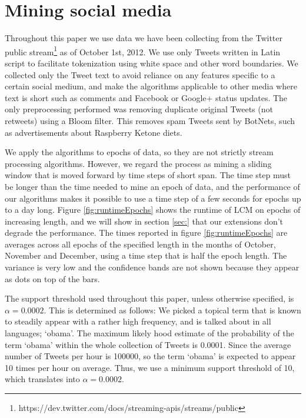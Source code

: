 \documentclass{sig-alternate}
\begin{document}

\section{Mining social media}
\label{sec:socmine}

Throughout this paper we use data we have been collecting from the Twitter public stream\footnote{https://dev.twitter.com/docs/streaming-apis/streams/public} as of October 1st, 2012. 
We use only Tweets written in Latin script to facilitate tokenization using white space and other word boundaries. We collected only the Tweet text to avoid reliance on any features specific to a certain social medium, and make the algorithms applicable to other media where text is short such as comments and Facebook or Google+ status updates. The only preprocessing performed was removing duplicate original Tweets (not retweets) using a Bloom filter. This removes spam Tweets sent by BotNets, such as advertisements about Raspberry Ketone diets.

We apply the algorithms to epochs of data, so they are not strictly stream processing algorithms. However, we regard the process as mining a sliding window that is moved forward by time steps of short span. The time step must be longer than the time needed to mine an epoch of data, and the performance of our algorithms makes it possible to use a time step of a few seconds for epochs up to a day long. Figure \ref{fig:runtimeEpochs} shows the runtime of LCM on epochs of increasing length, and we will show in section \ref{sec:} that our extensions don't degrade the performance. The times reported in figure \ref{fig:runtimeEpochs} are averages across all epochs of the specified length in the months of October, November and December, using a time step that is half the epoch length. The variance is very low and the confidence bands are not shown because they appear as dots on top of the bars. 

The support threshold used throughout this paper, unless otherwise specified, is $\alpha=0.0002$. This is determined as follows: We picked a topical term that is known to  steadily  appear with a rather high frequency, and is talked about in all languages; `obama'. The maximum likely hood estimate of the probability of the term `obama' within the whole collection of Tweets is 0.0001. Since the average number of Tweets per hour is 100000, so the term `obama' is expected to appear 10 times per hour on average. Thus, we use a minimum support threshold of 10, which translates into $\alpha = 0.0002$.
\end{document}
